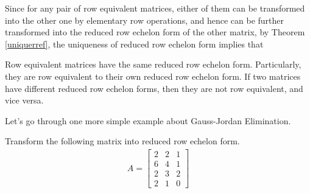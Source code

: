 Since for any pair of row equivalent matrices, either of them can be transformed into the other one by elementary row operations, and hence can be further transformed into the reduced row echelon form of the other matrix, by Theorem \ref{uniquerref}, the uniqueness of reduced row echelon form implies that
\begin{proper}
\label{proper:rowequivreduce}
Row equivalent matrices have the same reduced row echelon form. Particularly, they are row equivalent to their own reduced row echelon form. If two matrices have different reduced row echelon forms, then they are not row equivalent, and vice versa.
\end{proper}
Let's go through one more simple example about Gauss-Jordan Elimination.
\begin{exmp}
\label{ex:rref2}
Transform the following matrix into reduced row echelon form.
\begin{align*}
A =
\begin{bmatrix}
2 & 2 & 1 \\
6 & 4 & 1 \\
2 & 3 & 2 \\
2 & 1 & 0
\end{bmatrix}    
\end{align*}
\end{exmp}
